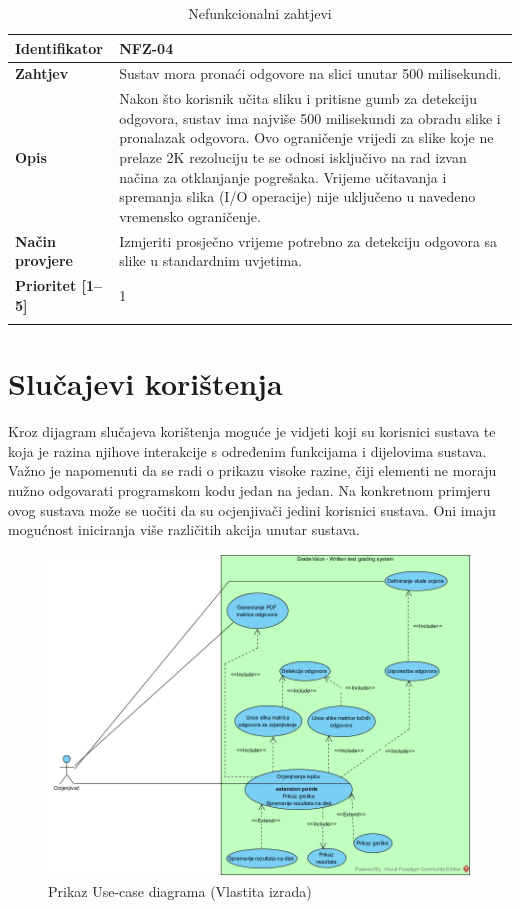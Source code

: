 \documentclass{foi}
\begin{document}
\begin{longtable}{|l|p{12cm}|}
    \textbf{Identifikator} & NFZ-04 \\ \hline
    \textbf{Zahtjev} & Sustav mora pronaći odgovore na slici unutar 500 milisekundi. \\ \hline
    \textbf{Opis} & Nakon što korisnik učita sliku i pritisne gumb za detekciju odgovora, sustav ima najviše 500 milisekundi za obradu slike i pronalazak odgovora. Ovo ograničenje vrijedi za slike koje ne prelaze 2K rezoluciju te se odnosi isključivo na rad izvan načina za otklanjanje pogrešaka. Vrijeme učitavanja i spremanja slika (I/O operacije) nije uključeno u navedeno vremensko ograničenje. \\ \hline
    \textbf{Način provjere} & Izmjeriti prosječno vrijeme potrebno za detekciju odgovora sa slike u standardnim uvjetima. \\ \hline
    \textbf{Prioritet [1--5]} & 1 \\ \hline
    
    \caption{Nefunkcionalni zahtjevi}
\end{longtable}

\section{Slučajevi korištenja}

Kroz dijagram slučajeva korištenja moguće je vidjeti koji su korisnici sustava te koja je razina njihove interakcije s određenim funkcijama i dijelovima sustava.
Važno je napomenuti da se radi o prikazu visoke razine, čiji elementi ne moraju nužno odgovarati programskom kodu jedan na jedan.
Na konkretnom primjeru ovog sustava može se uočiti da su ocjenjivači jedini korisnici sustava. Oni imaju mogućnost iniciranja više različitih akcija unutar sustava.

\begin{figure}[H]
    \centering
    \includegraphics[width=1.0\linewidth]{slike/useCase.jpg}
    \caption{Prikaz Use-case diagrama (Vlastita izrada)}
\end{figure}
\end{document}
